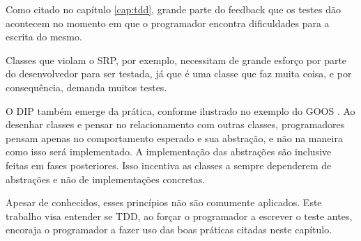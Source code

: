 Como citado no capítulo \ref{cap:tdd}, grande parte do feedback que os testes
dão acontecem no momento em que o programador encontra dificuldades para a
escrita do mesmo.

Classes que violam o SRP, por exemplo, necessitam de grande
esforço por parte do desenvolvedor para ser testada, já que é uma classe que faz
muita coisa, e por consequência, demanda muitos testes.

O DIP também emerge da prática, conforme ilustrado no exemplo do GOOS
\cite{GOOS}. Ao desenhar classes e pensar no relacionamento com outras classes,
programadores pensam apenas no comportamento esperado e sua abstração, e não na
maneira como isso será implementado. A implementação das abstrações são
inclusive feitas em fases posteriores. Isso incentiva as classes a
sempre dependerem de abstrações e não de implementações concretas.

Apesar de conhecidos, esses princípios não são comumente aplicados.
Este trabalho visa entender se TDD, ao forçar o programador a escrever o teste
antes, encoraja o programador a fazer uso das boas práticas citadas neste
capítulo.
